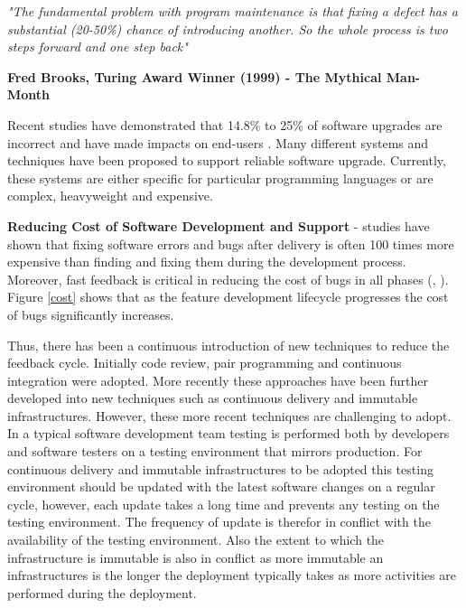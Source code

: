 \documentclass[a4paper,11pt,twoside]{report}
\begin{document}
\noindent\textit{ "The fundamental problem with program maintenance is that fixing a defect has a substantial (20-50\%) chance of introducing another. So the whole process is two steps forward and one step back"}  

\hfill \textbf{Fred Brooks, Turing Award Winner (1999) -  The Mythical Man-Month}\bigskip

Recent studies have demonstrated that 14.8\% to 25\% of software upgrades are incorrect and have made impacts on end-users \cite{bugs}. Many different systems and techniques have been proposed to support reliable software upgrade. Currently, these systems are either specific for particular programming languages or are complex, heavyweight and expensive.\medskip 

\noindent \textbf{Reducing Cost of Software Development and Support} - studies have shown that fixing software errors and bugs after delivery is often 100 times more expensive than finding and fixing them during the development process. Moreover, fast feedback is critical in reducing the cost of bugs in all phases (\cite{Boehm_a}, \cite{Boehm_b}). Figure \ref{cost} shows that as the feature development lifecycle progresses the cost of bugs significantly increases. 


Thus, there has been a continuous introduction of new techniques to reduce the feedback cycle.  Initially code review, pair programming and continuous integration were adopted.  More recently these approaches have been further developed into new techniques such as continuous delivery and immutable infrastructures.  However, these more recent techniques are challenging to adopt.  In a typical software development team testing is performed both by developers and software testers on a testing environment that mirrors production.  For continuous delivery and immutable infrastructures to be adopted this testing environment should be updated with the latest software changes on a regular cycle, however, each update takes a long time and prevents any testing on the testing environment.  The frequency of update is therefor in conflict with the availability of the testing environment.  Also the extent to which the infrastructure is immutable is also in conflict as more immutable an infrastructures is the longer the deployment typically takes as more activities are performed during the deployment. 
\end{document}
